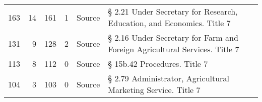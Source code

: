 \begin{tabular}{rrrrlp{}p{}}
   163 &      14 &          161 &            1 & Source          & § 2.21 Under Secretary for Research, Education, and Economics. Title 7     &                        \\
   131 &       9 &          128 &            2 & Source          & § 2.16 Under Secretary for Farm and Foreign Agricultural Services. Title 7 &                        \\
   113 &       8 &          112 &            0 & Source          & § 15b.42 Procedures. Title 7                                               &                        \\
   104 &       3 &          103 &            0 & Source          & § 2.79 Administrator, Agricultural Marketing Service. Title 7              &                        \\
\hline
\end{tabular}
